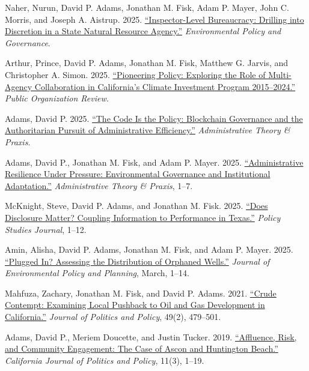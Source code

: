 \documentclass[11pt,letterpaper]{article}
\renewenvironment{itemize}{
  \begin{list}{}{
    \setlength{\leftmargin}{1.5em}
    \setlength{\itemsep}{0.25em}
    \setlength{\parskip}{0pt}
    \setlength{\parsep}{0.25em}
  }
}{
  \end{list}
}
\begin{document}
\begin{itemize}\leftmargin=2pt\itemindent=-15pt\leftmargin=2pt\itemindent=-15pt

    \item Naher, Nurun, David P. Adams, Jonathan M. Fisk, Adam P. Mayer, John C. Morris, and Joseph A. Aistrup. 2025. \href{https://doi.org/10.1002/eet.70038}{``Inspector-Level Bureaucracy: Drilling into Discretion in a State Natural Resource Agency.''} \emph{Environmental Policy and Governance}. 

    \item Arthur, Prince, David P. Adams, Jonathan M. Fisk, Matthew G. Jarvis, and Christopher A. Simon. 2025. \href{https://doi.org/10.1007/s11115-025-00586-3}{``Pioneering Policy: Exploring the Role of Multi-Agency Collaboration in California's Climate Investment Program 2015--2024.''} \emph{Public Organization Review.}

    \item Adams, David P. 2025. \href{https://doi.org/10.1080/10841806.2025.2585729}{``The Code Is the Policy: Blockchain Governance and the Authoritarian Pursuit of Administrative Efficiency.''} \emph{Administrative Theory \& Praxis}.

    \item Adams, David P., Jonathan M. Fisk, and Adam P. Mayer. 2025. \href{https://doi.org/10.1080/10841806.2025.2537600}{``Administrative Resilience Under Pressure: Environmental Governance and Institutional Adaptation.''} \emph{Administrative Theory \& Praxis}, 1--7.

    \item McKnight, Steve, David P. Adams, and Jonathan M. Fisk. 2025. \href{https://doi.org/10.1111/psj.70064}{``Does Disclosure Matter? Coupling Information to Performance in Texas.''} \emph{Policy Studies Journal}, 1--12.

    \item Amin, Alisha, David P. Adams, Jonathan M. Fisk, and Adam P. Mayer. 2025. \href{https://doi.org/10.1080/1523908X.2025.2480289}{``Plugged In? Assessing the Distribution of Orphaned Wells.''} \emph{Journal of Environmental Policy and Planning}, March, 1--14.

    \item Mahfuza, Zachary, Jonathan M. Fisk, and David P. Adams. 2021. \href{https://doi.org/10.1111/polp.12401}{``Crude Contempt: Examining Local Pushback to Oil and Gas Development in California.''} \emph{Journal of Politics and Policy}, 49(2), 479--501.

    \item Adams, David P., Meriem Doucette, and Justin Tucker. 2019. \href{https://escholarship.org/uc/item/2mz2n6qk}{``Affluence, Risk, and Community Engagement: The Case of Ascon and Huntington Beach.''} \emph{California Journal of Politics and Policy}, 11(3), 1--19.

\end{itemize}
\end{document}
